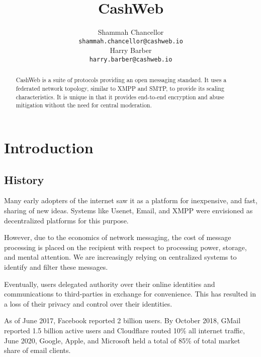 \documentclass{article}
\title{CashWeb}
\author{
 Shammah Chancellor \\
 \texttt{shammah.chancellor@cashweb.io} \\
 \And
 Harry Barber \\
 \texttt{harry.barber@cashweb.io} \\
}
\begin{document}
\maketitle

\begin{abstract}
CashWeb is a suite of protocols providing an open messaging standard. It uses a federated network topology, similar to XMPP and SMTP, to provide its scaling characteristics. It is unique in that it provides end-to-end encryption and abuse mitigation without the need for central moderation.
\end{abstract}

\section{Introduction}

\subsection{History}

Many early adopters of the internet saw it as a platform for inexpensive, and fast, sharing of new ideas. Systems like Usenet\cite{rfc5536}\cite{rfc5537}, Email\cite{rfc5322}\cite{rfc1939}\cite{rfc5321}\cite{rfc4551}, and XMPP\cite{rfc3920}\cite{rfc3921}\cite{rfc3922}\cite{rfc3923} were envisioned as decentralized platforms for this purpose.


However, due to the economics of network messaging, the cost of message processing is placed on the recipient with respect to processing power, storage, and mental attention. We are increasingly relying on centralized systems to identify and filter these messages. 

Eventually, users delegated authority over their online identities and communications to third-parties in exchange for convenience. This has resulted in a loss of their privacy and control over their identities.

As of June 2017, Facebook reported 2 billion users. By October 2018, GMail reported 1.5 billion active users\cite{gmail2018} and Cloudflare routed 10\% all internet traffic\cite{cloudflare2018}, June 2020, Google, Apple, and Microsoft held a total of 85\% of total market share of email clients\cite{emailshare2020}.
\end{document}
